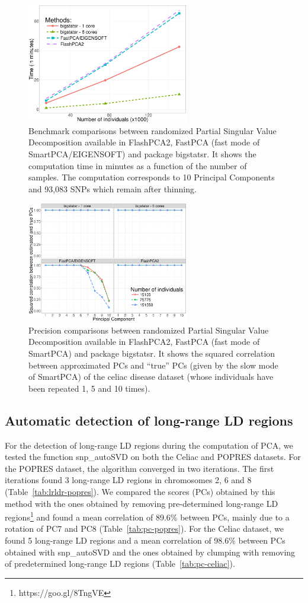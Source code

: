 \documentclass{bioinfo}
\begin{document}
\begin{figure}[!tpb]
\centerline{\includegraphics[width=200pt]{benchmark-pca}}
\caption{Benchmark comparisons between randomized Partial Singular Value Decomposition available in FlashPCA2, FastPCA (fast mode of SmartPCA/EIGENSOFT) and package bigstatsr. It shows the computation time in minutes as a function of the number of samples. The computation corresponds to 10 Principal Components and 93,083 SNPs which remain after thinning.}\label{fig:bench-pca}
\end{figure}

\begin{figure}[!tpb]
\centerline{\includegraphics[width=200pt]{precision-pca}}
\caption{Precision comparisons between randomized Partial Singular Value Decomposition available in FlashPCA2, FastPCA (fast mode of SmartPCA) and package bigstatsr. It shows the squared correlation between approximated PCs and ``true'' PCs (given by the slow mode of SmartPCA) of the celiac disease dataset (whose individuals have been repeated 1, 5 and 10 times).}\label{fig:prec-pca}
\end{figure}

\subsection{Automatic detection of long-range LD regions}

For the detection of long-range LD regions during the computation of PCA, we tested the function snp\_autoSVD on both the Celiac and POPRES datasets. For the POPRES dataset, the algorithm converged in two iterations. The first iterations found 3 long-range LD regions in chromosomes 2, 6 and 8 (Table~\ref{tab:lrldr-popres}). We compared the scores (PCs) obtained by this method with the ones obtained by removing pre-determined long-range LD regions\footnote{https://goo.gl/8TngVE} and found a mean correlation of 89.6\% between PCs, mainly due to a rotation of PC7 and PC8 (Table~\ref{tab:pc-popres}). For the Celiac dataset, we found 5 long-range LD regions and a mean correlation of 98.6\% between PCs obtained with snp\_autoSVD and the ones obtained by clumping with removing of predetermined long-range LD regions (Table~\ref{tab:pc-celiac}).
\end{document}

